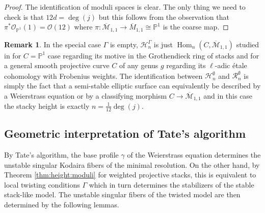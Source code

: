 \documentclass[a4paper,12pt]{amsart}
\theoremstyle{definition}
\newtheorem{rmk}[thm]{Remark}
\newcommand{\bP}{\mathbb{P}}
\newcommand{\cO}{\mathcal{O}}
\newcommand{\cH}{\mathcal{H}}
\newcommand{\cR}{\mathcal{R}}
\newcommand{\cM}{\mathcal{M}}
\newcommand{\Pb}{\mathbb{P}}
\DeclareMathOperator{\Hom}{Hom}
\begin{document}
	\begin{proof}
		The identification of moduli spaces is clear. The only thing we need to check is that $12d = \deg(j)$ but this follows from the observation that $\pi^*\cO_{\bP^1}(1) = \cO(12)$ where $\pi : \overline{\cM}_{1,1} \to \overline{M}_{1,1} \cong \bP^1$ is the coarse map. 
	\end{proof}
	
	\begin{rmk}
		In the special case $\Gamma$ is empty, $\cH^\Gamma_n$ is just $\Hom_n(C, \overline{\cM}_{1,1})$ studied in \cite{HP} for $C = \Pb^1$ case regarding its motive in the Grothendieck ring of stacks and \cite{BPS} for a general smooth projective curve $C$ of any genus $g$ regarding its $\ell$-adic \'etale cohomology with Frobenius weights. The identification between $\cH^\emptyset_n$ and $\cR^\emptyset_n$ is simply the fact that a semi-stable elliptic surface can equivalently be described by a Weierstrass equation or by a classifying morphism $C \to \overline{\cM}_{1,1}$ and in this case the stacky height is exactly $n = \frac{1}{12}\deg(j)$.
	\end{rmk}
	
	\subsection{Geometric interpretation of Tate's algorithm} 
	
	By Tate's algorithm, the base profile $\gamma$ of the Weierstrass equation determines the unstable singular Kodaira fibers of the minimal resolution. On the other hand, by Theorem \ref{thm:height:moduli} for weighted projective stacks, this is equivalent to local twisting conditions $\Gamma$ which in turn determines the stabilizers of the stable stack-like model. The unstable singular fibers of the twisted model are then determined by the following lemmas. 
	
\end{document}
